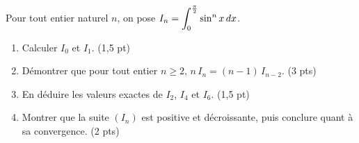 \begin{devoir}[2 heures]
Pour tout entier naturel $n$, on pose
$\displaystyle I_{n} = \int_{0}^{\frac{\pi}{2}}\sin^{n}x\,dx$.
\begin{enumerate}[label=\textbf{\arabic*.}, leftmargin=*, itemsep=0.2em]
  \item Calculer $I_{0}$ et $I_{1}$. \hfill\textup{(1,5 pt)}
  \item Démontrer que pour tout entier $n \geq 2$,
        $n\,I_{n} = (n-1)\,I_{n-2}$. \hfill\textup{(3 pts)}
  \item En déduire les valeurs exactes de $I_{2}$, $I_{4}$ et $I_{6}$.
        \hfill\textup{(1,5 pt)}
  \item Montrer que la suite $(I_{n})$ est positive et décroissante, puis
        conclure quant à sa convergence. \hfill\textup{(2 pts)}
\end{enumerate}
\end{devoir}

